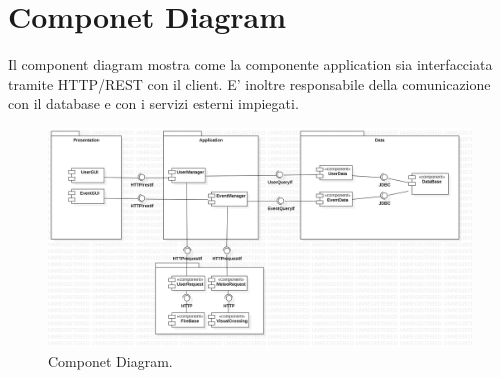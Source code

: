 \section{Componet Diagram} 
Il component diagram mostra come la componente application sia interfacciata tramite HTTP/REST con il client. E' inoltre responsabile 
della comunicazione con il database e con i servizi esterni impiegati.
\begin{figure}[h!]
	\centering
	\includegraphics[width=0.8\linewidth]{diagrammi/ComponentDiagram1.png}
	\caption{Componet Diagram.}
	\label{fig:ComponentDiagram}
\end{figure}